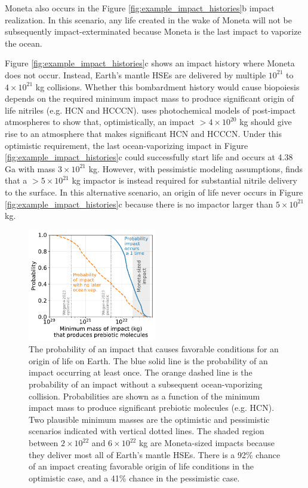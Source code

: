 \documentclass[manuscript]{aastex63}
\begin{document}
Moneta also occurs in the Figure \ref{fig:example_impact_histories}b impact realization. In this scenario, any life created in the wake of Moneta will not be subsequently impact-exterminated because Moneta is the last impact to vaporize the ocean.

Figure \ref{fig:example_impact_histories}c shows an impact history where Moneta does not occur. Instead, Earth's mantle HSEs are delivered by multiple $10^{21}$ to $4 \times 10^{21}$ kg collisions. Whether this bombardment history would cause biopoiesis depends on the required minimum impact mass to produce significant origin of life nitriles (e.g. HCN and HCCCN). \citet{Wogan_2023} uses photochemical models of post-impact atmospheres to show that, optimistically, an impact $> 4 \times 10^{20}$ kg should give rise to an atmosphere that makes significant HCN and HCCCN. Under this optimistic requirement, the last ocean-vaporizing impact in Figure \ref{fig:example_impact_histories}c could successfully start life and occurs at 4.38 Ga with mass $3 \times 10^{21}$ kg. However, with pessimistic modeling assumptions, \citet{Wogan_2023} finds that a $> 5 \times 10^{21}$ kg impactor is instead required for substantial nitrile delivery to the surface. In this alternative scenario, an origin of life never occurs in Figure \ref{fig:example_impact_histories}c because there is no impactor larger than $5 \times 10^{21}$ kg.

\begin{figure}
  \centering
  \includegraphics[width=0.5\textwidth]{figures/probabilities_of_impacts.pdf}
  \caption{The probability of an impact that causes favorable conditions for an origin of life on Earth. The blue solid line is the probability of an impact occurring at least once. The orange dashed line is the probability of an impact without a subsequent ocean-vaporizing collision. Probabilities are shown as a function of the minimum impact mass to produce significant prebiotic molecules (e.g. HCN). Two plausible minimum masses are the \citet{Wogan_2023} optimistic and pessimistic scenarios indicated with vertical dotted lines. The shaded region between $2 \times 10^{22}$ and $6 \times 10^{22}$ kg are Moneta-sized impacts because they deliver most all of Earth's mantle HSEs. There is a 92\% chance of an impact creating favorable origin of life conditions in the \citet{Wogan_2023} optimistic case, and a 41\% chance in the pessimistic case.}
  \label{fig:probabilities_of_impacts}
\end{figure}
\end{document}
